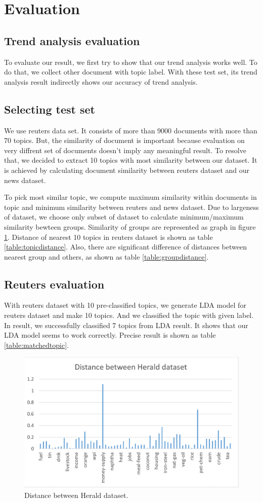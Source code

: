 \section{Evaluation}

\subsection{Trend analysis evaluation}
To evaluate our result, we first try to show that our trend analysis
works well. To do that, we collect other document with topic label.
With these test set, its trend analysis result indirectly shows our
accuracy of trend analysis.
\subsection{Selecting test set}
We use reuters data set. It consists of more than 9000 documents
with more than 70 topics. But, the similarity of document is important
because evaluation on very diffrent set of documents doesn't imply
any meaningful result. To resolve that, we decided to extract 10 topics
with most similarity between our dataset. It is achieved by calculating
document similarity between reuters dataset and our news dataset.

To pick most similar topic, we compute maximum similarity within documents
in topic and minimum similarity between reuters and news dataset. Due to
largeness of dataset, we choose only subset of dataset to calculate
minimum/maximum similarity bewteen groups. Similarity of groups are
represented as graph in figure \ref{fig:distance}. Distance of nearest
10 topics in reuters dataset is shown as table \ref{table:topicdistance}.
Also, there are significant difference of distances between nearest group and
others, as shown as table \ref{table:groupdistance}.

\subsection{Reuters evaluation}
With reuters dataset with 10 pre-classified topics, we generate LDA
model for reuters dataset and make 10 topics. And we classified the topic
with given label. In result, we successfully classified 7 topics from
LDA result. It shows that our LDA model seems to work correctly. Precise
result is shown as table \ref{table:matchedtopic}.

\begin{figure}[!htbp]
  \centering
  \includegraphics[width=0.8\linewidth]{Distance1}
  \caption{Distance between Herald dataset.}
  \label{fig:distance}
\end{figure}

